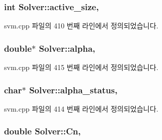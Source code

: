 \hypertarget{class_solver_a06ba1b87b3749cc545e573151b7beca0}{
\subsubsection[{active\+\_\+size}]{\setlength{\rightskip}{0pt plus 5cm}int Solver\+::active\+\_\+size\hspace{0.3cm}{\ttfamily [protected]}, {\ttfamily [inherited]}}}\label{class_solver_a06ba1b87b3749cc545e573151b7beca0}


svm.\+cpp 파일의 410 번째 라인에서 정의되었습니다.

\hypertarget{class_solver_a00d7a7cefa2504d41c7db6cd7cc6b428}{
\subsubsection[{alpha}]{\setlength{\rightskip}{0pt plus 5cm}double$\ast$ Solver\+::alpha\hspace{0.3cm}{\ttfamily [protected]}, {\ttfamily [inherited]}}}\label{class_solver_a00d7a7cefa2504d41c7db6cd7cc6b428}


svm.\+cpp 파일의 415 번째 라인에서 정의되었습니다.

\hypertarget{class_solver_a9fe653e04c43956d5fb86635651b0003}{
\subsubsection[{alpha\+\_\+status}]{\setlength{\rightskip}{0pt plus 5cm}char$\ast$ Solver\+::alpha\+\_\+status\hspace{0.3cm}{\ttfamily [protected]}, {\ttfamily [inherited]}}}\label{class_solver_a9fe653e04c43956d5fb86635651b0003}


svm.\+cpp 파일의 414 번째 라인에서 정의되었습니다.

\hypertarget{class_solver_a38d741d194839fb445f982dd78e0b97b}{
\subsubsection[{Cn}]{\setlength{\rightskip}{0pt plus 5cm}double Solver\+::\+Cn\hspace{0.3cm}{\ttfamily [protected]}, {\ttfamily [inherited]}}}\label{class_solver_a38d741d194839fb445f982dd78e0b97b}



